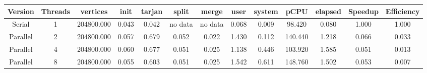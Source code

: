 \begin{tabular}{|c|c|c|c|c|c|c|c|c|c|c|c|c|}
\toprule
 Version &  Threads &   vertices &  init &  tarjan &   split &   merge &  user &  system &    pCPU &  elapsed &  Speedup &  Efficiency \\
\midrule
  Serial &        1 & 204800.000 & 0.043 &   0.042 & no data & no data & 0.068 &   0.009 &  98.420 &    0.080 &    1.000 &       1.000 \\
Parallel &        2 & 204800.000 & 0.057 &   0.679 &   0.052 &   0.022 & 1.430 &   0.112 & 140.440 &    1.218 &    0.066 &       0.033 \\
Parallel &        4 & 204800.000 & 0.060 &   0.677 &   0.051 &   0.025 & 1.138 &   0.446 & 103.920 &    1.585 &    0.051 &       0.013 \\
Parallel &        8 & 204800.000 & 0.055 &   0.603 &   0.051 &   0.025 & 1.542 &   0.611 & 148.760 &    1.502 &    0.053 &       0.007 \\
\bottomrule
\end{tabular}

